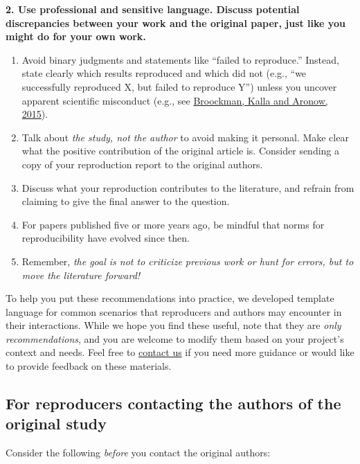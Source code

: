 \textbf{2. Use professional and sensitive language. Discuss potential discrepancies between your work and the original paper, just like you might do for your own work.}

\begin{enumerate}[label=(\alph*)]
    \item Avoid binary judgments and statements like ``failed to reproduce.'' Instead, state clearly which results reproduced and which did not (e.g., ``we successfully reproduced X, but failed to reproduce Y'') unless you uncover apparent scientific misconduct (e.g., see \href{https://doi.org/10.31222/osf.io/qy2se}{Broockman, Kalla and Aronow, 2015}).
    \item Talk about \textit{the study, not the author} to avoid making it personal. Make clear what the positive contribution of the original article is. Consider sending a copy of your reproduction report to the original authors.
    \item Discuss what your reproduction contributes to the literature, and refrain from claiming to give the final answer to the question.
    \item For papers published five or more years ago, be mindful that norms for reproducibility have evolved since then.
    \item Remember, \textit{the goal is not to criticize previous work or hunt for errors, but to move the literature forward!}
\end{enumerate}

To help you put these recommendations into practice, we developed template language for common scenarios that reproducers and authors may encounter in their interactions. While we hope you find these useful, note that they are \textit{only recommendations}, and you are welcome to modify them based on your project's context and needs. Feel free to \href{mailto:acre@berkeley.edu}{contact us} if you need more guidance or would like to provide feedback on these materials.

\subsection{For reproducers contacting the authors of the original study}

Consider the following \textit{before} you contact the original authors:

